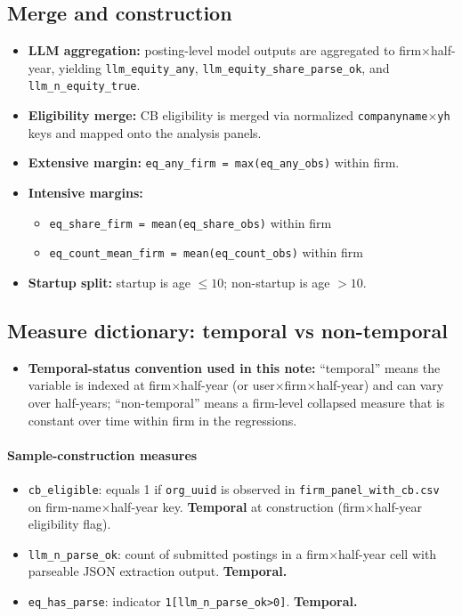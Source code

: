 \documentclass{article}
\begin{document}
\subsection*{Merge and construction}
\begin{itemize}
  \item \textbf{LLM aggregation:} posting-level model outputs are aggregated to firm$\times$half-year, yielding \texttt{llm\_equity\_any}, \texttt{llm\_equity\_share\_parse\_ok}, and \texttt{llm\_n\_equity\_true}.
  \item \textbf{Eligibility merge:} CB eligibility is merged via normalized \texttt{companyname}$\times$\texttt{yh} keys and mapped onto the analysis panels.
  \item \textbf{Extensive margin:} \texttt{eq\_any\_firm = max(eq\_any\_obs)} within firm.
  \item \textbf{Intensive margins:}
    \begin{itemize}
      \item \texttt{eq\_share\_firm = mean(eq\_share\_obs)} within firm
      \item \texttt{eq\_count\_mean\_firm = mean(eq\_count\_obs)} within firm
    \end{itemize}
  \item \textbf{Startup split:} startup is age $\leq 10$; non-startup is age $>10$.
\end{itemize}

\subsection*{Measure dictionary: temporal vs non-temporal}
\begin{itemize}
  \item \textbf{Temporal-status convention used in this note:} ``temporal'' means the variable is indexed at firm$\times$half-year (or user$\times$firm$\times$half-year) and can vary over half-years; ``non-temporal'' means a firm-level collapsed measure that is constant over time within firm in the regressions.
\end{itemize}

\paragraph{Sample-construction measures}
\begin{itemize}
  \item \texttt{cb\_eligible}: equals 1 if \texttt{org\_uuid} is observed in \texttt{firm\_panel\_with\_cb.csv} on firm-name$\times$half-year key. \textbf{Temporal} at construction (firm$\times$half-year eligibility flag).
  \item \texttt{llm\_n\_parse\_ok}: count of submitted postings in a firm$\times$half-year cell with parseable JSON extraction output. \textbf{Temporal.}
  \item \texttt{eq\_has\_parse}: indicator \texttt{1[llm\_n\_parse\_ok>0]}. \textbf{Temporal.}
\end{itemize}
\end{document}
